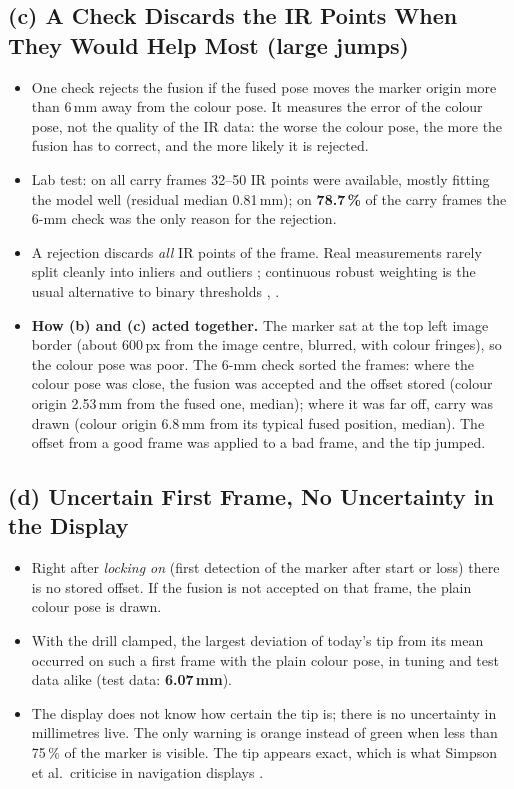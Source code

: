 \documentclass[11pt,a4paper,fleqn]{article}
\begin{document}
\subsection*{(c) A Check Discards the IR Points When They Would Help Most \textnormal{(large jumps)}}
\begin{itemize}
  \item One check rejects the fusion if the fused pose moves the marker origin more than 6\,mm away from the colour
        pose. It measures the error of the colour pose, not the quality of the IR data: the worse the colour pose,
        the more the fusion has to correct, and the more likely it is rejected.
  \item Lab test: on all carry frames 32--50 IR points were available, mostly fitting the model well (residual median
        0.81\,mm); on \textbf{78.7\,\%} of the carry frames the 6-mm check was the only reason for the rejection.
  \item A rejection discards \emph{all} IR points of the frame. Real measurements rarely split cleanly into inliers
        and outliers \cite[p.~308]{triggs2000bundle}; continuous robust weighting is the usual alternative to binary
        thresholds \cite[Sec.~II]{kerl2013robust}, \cite[§9.3--9.4]{zhang1997parameter}.
  \item \textbf{How (b) and (c) acted together.} The marker sat at the top left image border (about 600\,px from the
        image centre, blurred, with colour fringes), so the colour pose was poor. The 6-mm check sorted the frames:
        where the colour pose was close, the fusion was accepted and the offset stored (colour origin 2.53\,mm from
        the fused one, median); where it was far off, carry was drawn (colour origin 6.8\,mm from its typical fused
        position, median). The offset from a good frame was applied to a bad frame, and the tip jumped.
\end{itemize}

\subsection*{(d) Uncertain First Frame, No Uncertainty in the Display}
\begin{itemize}
  \item Right after \emph{locking on} (first detection of the marker after start or loss) there is no stored offset.
        If the fusion is not accepted on that frame, the plain colour pose is drawn.
  \item With the drill clamped, the largest deviation of today's tip from its mean occurred on such a first frame
        with the plain colour pose, in tuning and test data alike (test data: \textbf{6.07\,mm}).
  \item The display does not know how certain the tip is; there is no uncertainty in millimetres live. The only
        warning is orange instead of green when less than 75\,\% of the marker is visible. The tip appears exact,
        which is what Simpson et al.\ criticise in navigation displays \cite{simpson2014computation}.
\end{itemize}
\end{document}
